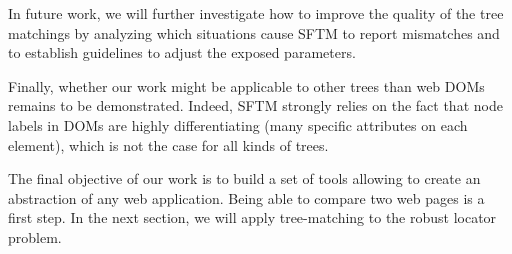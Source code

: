 In future work, we will further investigate how to improve the quality of the tree matchings by analyzing which situations cause SFTM to report mismatches and to establish guidelines to adjust the exposed parameters.

Finally, whether our work might be applicable to other trees than web DOMs remains to be demonstrated.
Indeed, SFTM strongly relies on the fact that node labels in DOMs are highly differentiating (many specific attributes on each element), which is not the case for all kinds of trees.

The final objective of our work is to build a set of tools allowing to create an abstraction of any web application. Being able to compare two web pages is a first step.
In the next section, we will apply tree-matching to the robust locator problem.







